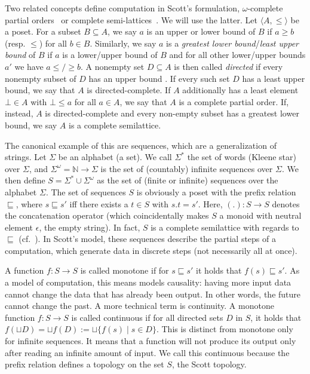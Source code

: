 Two related concepts define computation in Scott's formulation, $\omega$-complete partial orders~\cite{gunter} or complete semi-lattices~\cite{lee_matsikoudis_semantics}. 
We will use the latter.
Let $\langle A, \leq \rangle$ be a \ac{poset}. For a subset $B \subseteq A$, we say $a$ is an upper or lower bound of $B$ if $a \geq b$ (resp. $\leq$) for all $b \in B$. 
Similarly, we say $a$ is a \emph{greatest lower bound}/\emph{least upper bound} of $B$ if $a$ is a lower/upper bound of $B$ and for all other lower/upper bounds $a'$ we have $a \leq/\geq b$.
A nonempty set $D \subseteq A$ is then called \emph{directed} if every nonempty subset of $D$ has an upper bound . If every such set $D$ has a least upper bound, we say that $A$ is directed-complete.
If $A$ additionally has a least element $\bot \in A$ with $\bot \leq a$ for all $a \in A$, we say that $A$ is a complete partial order.
If, instead, $A$ is directed-complete and every non-empty subset has a greatest lower bound, we say $A$ is a complete semilattice.

The canonical example of this are sequences, which are a generalization of strings. Let $\Sigma$ be an alphabet (a set). 
We call $\Sigma^*$ the set of words (Kleene star) over $\Sigma$, and $\Sigma^\omega = \mathbb{N} \rightarrow \Sigma$ is the set of (countably) infinite sequences over $\Sigma$.
We then define $S = \Sigma^* \cup \Sigma^\omega$ as the set of (finite or infinite) sequences over the alphabet $\Sigma$.
The set of sequences $S$ is obviously a \ac{poset} with the prefix relation $\sqsubseteq$, where $s \sqsubseteq s'$ iff there exists a $t \in S$ with $s.t = s'$.
Here, $(.) : S \rightarrow S$ denotes the concatenation operator (which coincidentally makes $S$ a monoid with neutral element $\epsilon$, the empty string).
In fact, $S$ is a complete semilattice with regards to $\sqsubseteq$ (cf.~\cite{lee_matsikoudis_semantics}).
In Scott's model, these sequences describe the partial steps of a computation, which generate data in discrete steps (not necessarily all at once). 

A function $f : S \rightarrow S$ is called monotone if for $s \sqsubseteq s'$ it holds that $f(s) \sqsubseteq s'$.
As a model of computation, this means models causality: having more input data cannot change the data that has already been output.
In other words, the future cannot change the past.
A more technical term is continuity.
A monotone function $f : S \rightarrow S$ is called continuous if for all directed sets $D$ in $S$, it holds that $f (\sqcup D) = \sqcup f(D) := \sqcup \{ f(s) \mid s \in D \}$.
This is distinct from monotone only for infinite sequences. It means that a function will not produce its output only after reading an infinite amount of input.
We call this continuous because the prefix relation defines a topology on the set $S$, the Scott topology.


